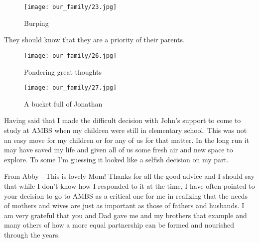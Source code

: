 \begin{figure}
\centering
\texttt{[image: our\_family/23.jpg]}
\caption{
Burping
}
\end{figure}

They should know that they are a priority of their parents.

\begin{figure}
\centering
\texttt{[image: our\_family/26.jpg]}
\caption{
Pondering great thoughts
}
\end{figure}

\begin{figure}
\centering
\texttt{[image: our\_family/27.jpg]}
\caption{
A bucket full of Jonathan 
}
\end{figure}

Having said that I made the difficult decision with John's support to come to study at AMBS when my children were still in elementary school.
This was not an easy move for my children or for any of us for that matter.
In the long run it may have saved my life and given all of us some fresh air and new space to explore.
To some I'm guessing it looked like a selfish decision on my part.

From Abby - This is lovely Mom! Thanks for all the good advice and I should say that while I don't know how I responded to it at the time, I have often pointed to your decision to go to AMBS as a critical one for me in realizing that the needs of mothers and wives are just as important as those of fathers and husbands.
I am very grateful that you and Dad gave me and my brothers that example and many others of how a more equal partnership can be formed and nourished through the years.





